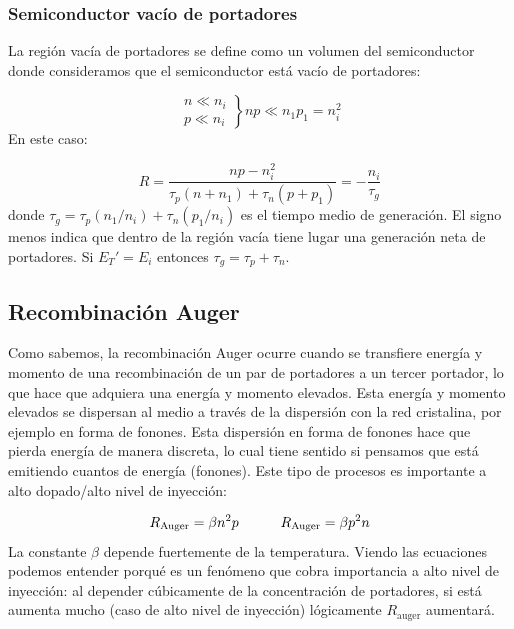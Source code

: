 \subsubsection{Semiconductor vacío de portadores}

La región vacía de portadores se define como un volumen del semiconductor donde consideramos que el semiconductor está vacío de portadores:

\begin{equation}
	\left. \begin{matrix}
		n \ll n_i \\
		p \ll n_i
	\end{matrix} \right\rbrace np \ll n_1 p_1 = n_i^2
\end{equation}
En este caso:

\begin{equation}
	R = \frac{np-n_i^2}{\tau_p (n+n_1)+\tau_n(p+p_1)} = - \frac{n_i}{\tau_g}
\end{equation}
donde $\tau_g = \tau_p (n_1/n_i) + \tau_n (p_1 / n_i)$ es el tiempo medio de generación. El signo menos indica que dentro de la región vacía tiene lugar una generación neta de portadores. Si $E_T'=E_i$ entonces $\tau_g=\tau_p+\tau_n$.

\subsection{Recombinación Auger}

Como sabemos, la recombinación Auger ocurre cuando se transfiere energía y momento de una recombinación de un par de portadores a un tercer portador, lo que hace que adquiera una energía y momento elevados. Esta energía y momento elevados se dispersan al medio a través de la dispersión con la red cristalina, por ejemplo en forma de fonones. Esta dispersión en forma de fonones hace que pierda energía de manera discreta, lo cual tiene sentido si pensamos que está emitiendo cuantos de energía (fonones). Este tipo de procesos es importante a alto dopado/alto nivel de inyección:

\begin{equation}
	R_{\text{Auger}} = \beta n^2 p \quad \quad \quad R_{\text{Auger}} = \beta p^2 n
\end{equation}
La constante $\beta$ depende fuertemente de la temperatura. Viendo las ecuaciones podemos entender porqué es un fenómeno que cobra importancia a alto nivel de inyección: al depender cúbicamente de la concentración de portadores, si está aumenta mucho (caso de alto nivel de inyección) lógicamente $R_{\text{auger}}$ aumentará.



